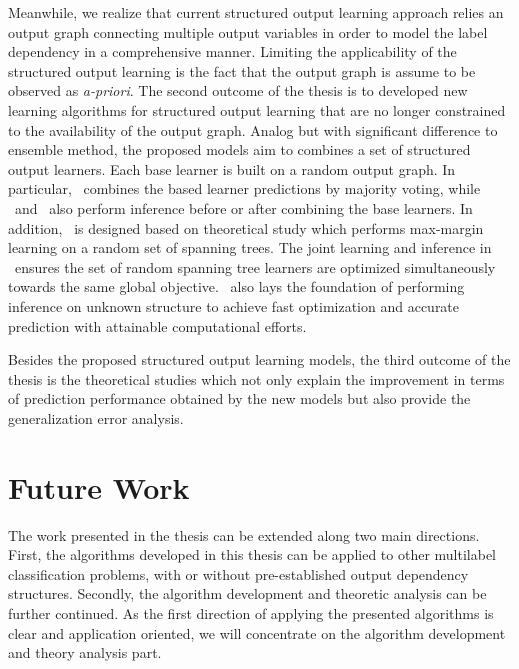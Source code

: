 {Meanwhile, we realize that current structured output learning approach relies an output graph connecting multiple output variables in order to model the label dependency in a comprehensive manner.
Limiting the applicability of the structured output learning is the fact that the output graph is assume to be observed as \textit{a-priori}.
The second outcome of the thesis is to developed new learning algorithms for structured output learning that are no longer constrained to the availability of the output graph.
Analog but with significant difference to ensemble method, the proposed models aim to combines a set of structured output learners.
Each base learner is built on a random output graph.
In particular, \mve\ combines the based learner predictions by majority voting, while \amm\ and \mam\ also perform inference before or after combining the base learners.
In addition, \rta\ is designed based on theoretical study which performs max-margin learning on a random set of spanning trees.
The joint learning and inference in \rta\ ensures the set of random spanning tree learners are optimized simultaneously towards the same global objective.
\rta\ also lays the foundation of performing inference on unknown structure to achieve fast optimization and accurate prediction with attainable computational efforts.

Besides the proposed structured output learning models, the third outcome of the thesis is the theoretical studies which not only explain the improvement in terms of prediction performance obtained by the new models but also provide the generalization error analysis.


\section{Future Work}

The work presented in the thesis can be extended along two main directions.
First, the algorithms developed in this thesis can be applied to other multilabel classification problems, with or without pre-established output dependency structures.
Secondly, the algorithm development and theoretic analysis can be further continued.
As the first direction of applying the presented algorithms is clear and application oriented, we will concentrate on the algorithm development and theory analysis part.

}
